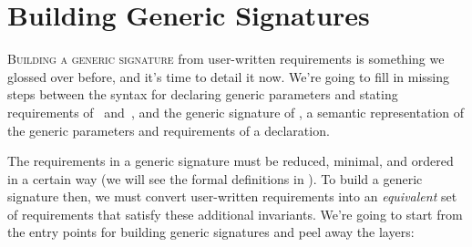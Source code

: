 \documentclass[../generics]{subfiles}
\begin{document}
\chapter{Building Generic Signatures}\label{chap:building generic signatures}

\lettrine{B}{uilding a generic signature} from user-written requirements is something we glossed over before, and it's time to detail it now. We're going to fill in missing steps between the syntax for declaring generic parameters and stating requirements of ~and~, and the generic signature of , a semantic representation of the generic parameters and requirements of a declaration.

The requirements in a generic signature must be reduced, minimal, and ordered in a certain way (we will see the formal definitions in ). To build a generic signature then, we must convert user-written requirements into an \emph{equivalent} set of requirements that satisfy these additional invariants. We're going to start from the entry points for building generic signatures and peel away the layers:
\end{document}
